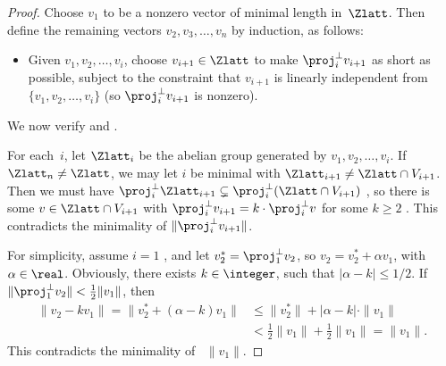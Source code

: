 \begin{proof}
Choose $v_1$ to be a nonzero vector of minimal length in~$\Zlatt$. Then define the remaining vectors $v_2,v_3,\ldots,v_n$ by induction, as follows:%
	\begin{itemize}
	\item[] Given $v_1,v_2,\ldots,v_i$, choose $v_{i+1} \in \Zlatt$ to make $\proj_i^\perp v_{i+1}$ as short as possible, subject to the constraint that $v_{i+1}$ is linearly independent from $\{v_1,v_2,\ldots,v_i\}$ \textup(so $\proj_i^\perp v_{i+1}$ is nonzero\/\textup). 
	\end{itemize}
We now verify  and .

For each~$i$, let $\Zlatt_i$ be the abelian group generated by $v_1,v_2,\ldots,v_i$. If $\Zlatt_n \neq \Zlatt$, we may let $i$ be minimal with $\Zlatt_{i+1} \neq \Zlatt \cap V_{i+1}$. Then we must have $\proj_i^\perp \Zlatt_{i+1} \subsetneq \proj_i^\perp(\Zlatt \cap V_{i+1})$ , so there is some $v \in \Zlatt \cap V_{i+1}$ with $\proj_i^\perp v_{i+1} = k \cdot \proj_i^\perp v$ for some $k \ge 2$ .  This contradicts the minimality of $\|\proj_i^\perp v_{i+1}\|$.

For simplicity, assume $i = 1$ , and let $v_2^* = \proj_1^\perp v_2$, so $v_2 = v_2^* + \alpha v_1$, with $\alpha \in \real$. Obviously, there exists $k \in \integer$, such that $|\alpha - k| \le 1/2$. If 
		$ \| \proj_1^\perp v_2 \| <  \frac{1}{2} \| v_1 \| $,
then
	\begin{align*}
	 \|v_2 - k v_1\| 
	= \|v_2^* + (\alpha - k)v_1 \|
	&\le  \| v_2^*\| + |\alpha - k| \cdot \| v_1 \| 
	\\&< \frac{1}{2} \|v_1\| +  \frac{1}{2} \| v_1 \|
	= \|v_1 \| 
	. \end{align*}
This contradicts the minimality of ~$\|v_1\|$.
\end{proof}

